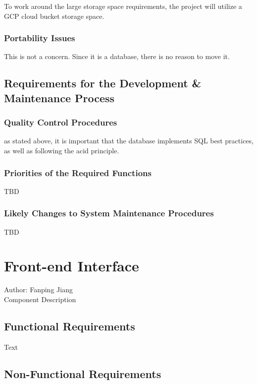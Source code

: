 \documentclass[12pt]{article}
\begin{document}
To work around the large storage space requirements, the project will utilize a GCP cloud bucket
storage space.

\subsubsection {Portability Issues}

This is not a concern. Since it is a database, there is no reason to move it.

\subsection{Requirements for the Development & Maintenance Process}


\subsubsection {Quality Control Procedures}

as stated above, it is important that the database implements SQL best practices, as well as
following the acid principle.

\subsubsection {Priorities of the Required Functions}

TBD

\subsubsection {Likely Changes to System Maintenance Procedures}

TBD

\section{Front-end Interface}
Author: Fanping Jiang\\

\noindent Component Description

\subsection{Functional Requirements}

Text

\subsection{Non-Functional Requirements}
\end{document}
